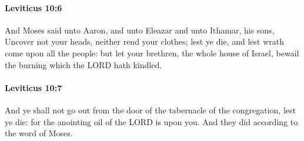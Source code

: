 		\paragraph{Leviticus 10:6} %
			\label{LEVITICUS-10-6}

			And Moses said unto Aaron, and unto Eleazar and unto Ithamar, his sons, Uncover not your heads, neither rend your clothes; lest ye die, and lest wrath come upon all the people: but let your brethren, the whole house of Israel, bewail the burning which the LORD hath kindled.


		\paragraph{Leviticus 10:7} %
			\label{LEVITICUS-10-7}

			And ye shall not go out from the door of the tabernacle of the congregation, lest ye die: for the anointing oil of the LORD is upon you. And they did according to the word of Moses.

